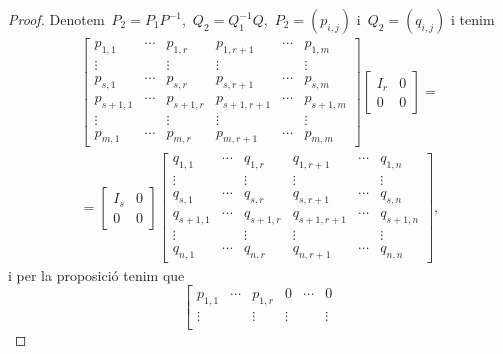 \documentclass[../../main.tex]{subfiles}
\begin{document}
\begin{theorem}
\begin{proof}
            Denotem~\(P_{2}=P_{1}P^{-1}\),~\(Q_{2}=Q_{1}^{-1}Q\),~\(P_{2}=(p_{i,j})\) i~\(Q_{2}=(q_{i,j})\) i tenim
            \begin{multline*}
            \left[\begin{array}{ccc|ccc}
            p_{1,1} & \cdots & p_{1,r} & p_{1,r+1} & \cdots & p_{1,m} \\
            \vdots & & \vdots & \vdots & & \vdots \\
            p_{s,1} & \cdots & p_{s,r} & p_{s,r+1} & \cdots & p_{s,m} \\\hline
            p_{s+1,1} & \cdots & p_{s+1,r} & p_{s+1,r+1} & \cdots & p_{s+1,m} \\
            \vdots & & \vdots & \vdots & & \vdots \\
            p_{m,1} & \cdots & p_{m,r} & p_{m,r+1} & \cdots & p_{m,m}
            \end{array}\right]
            \left[\begin{array}{c|c}
            I_{r} & 0\\\hline
            0 & 0
            \end{array}\right]=\\=
            \left[\begin{array}{c|c}
            I_{s} & 0\\\hline
            0 & 0
            \end{array}\right]
            \left[\begin{array}{ccc|ccc}
            q_{1,1} & \cdots & q_{1,r} & q_{1,r+1} & \cdots & q_{1,n} \\
            \vdots & & \vdots & \vdots & & \vdots \\
            q_{s,1} & \cdots & q_{s,r} & q_{s,r+1} & \cdots & q_{s,n} \\\hline
            q_{s+1,1} & \cdots & q_{s+1,r} & q_{s+1,r+1} & \cdots & q_{s+1,n} \\
            \vdots & & \vdots & \vdots & & \vdots \\
            q_{n,1} & \cdots & q_{n,r} & q_{n,r+1} & \cdots & q_{n,n}
            \end{array}\right],
            \end{multline*}
            i per la proposició  tenim que
            \[\left[\begin{array}{cccccc}
            p_{1,1} & \cdots & p_{1,r} & 0 & \cdots & 0 \\
            \vdots & & \vdots & \vdots & & \vdots \\

\end{array}\]
\end{proof}
\end{theorem}
\end{document}
